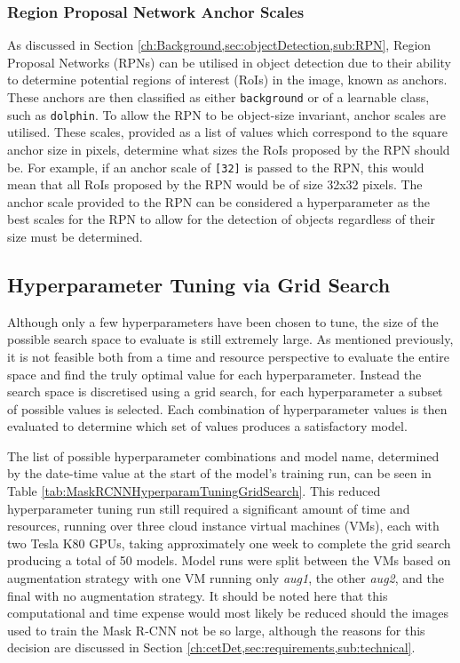 \subsubsection{Region Proposal Network Anchor Scales}\label{ch:cetDet,sec:ModelSelection,sub:TrainingHyperparameters,subsub:RPNAnchorScales}

As discussed in Section \ref{ch:Background,sec:objectDetection,sub:RPN}, Region Proposal Networks (RPNs) can be utilised in object detection due to their ability to determine potential regions of interest (RoIs) in the image, known as anchors. These anchors are then classified as either \texttt{background} or of a learnable class, such as \texttt{dolphin}. To allow the RPN to be object-size invariant, anchor scales are utilised. These scales, provided as a list of values which correspond to the square anchor size in pixels, determine what sizes the RoIs proposed by the RPN should be. For example, if an anchor scale of \texttt{[32]} is passed to the RPN, this would mean that all RoIs proposed by the RPN would be of size 32x32 pixels. The anchor scale provided to the RPN can be considered a hyperparameter as the best scales for the RPN to allow for the detection of objects regardless of their size must be determined. 

\subsection{Hyperparameter Tuning via Grid Search}\label{ch:cetDet,sec:ModelSelection,sub:HyperparameterTuning}

Although only a few hyperparameters have been chosen to tune, the size of the possible search space to evaluate is still extremely large. As mentioned previously, it is not feasible both from a time and resource perspective to evaluate the entire space and find the truly optimal value for each hyperparameter. Instead the search space is discretised using a grid search, for each hyperparameter a subset of possible values is selected. Each combination of hyperparameter values is then evaluated to determine which set of values produces a satisfactory model. 

The list of possible hyperparameter combinations and model name, determined by the date-time value at the start of the model's training run, can be seen in Table \ref{tab:MaskRCNNHyperparamTuningGridSearch}. This reduced hyperparameter tuning run still required a significant amount of time and resources, running over three cloud instance virtual machines (VMs), each with two Tesla K80 GPUs, taking approximately one week to complete the grid search producing a total of 50 models. Model runs were split between the VMs based on augmentation strategy with one VM running only \textit{aug1}, the other \textit{aug2}, and the final with no augmentation strategy. It should be noted here that this computational and time expense would most likely be reduced should the images used to train the Mask R-CNN not be so large, although the reasons for this decision are discussed in Section \ref{ch:cetDet,sec:requirements,sub:technical}.

